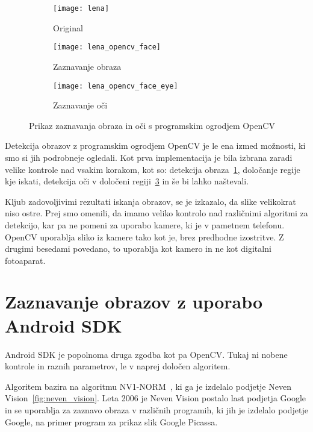 \begin{figure}[!ht]
    \centering
    \begin{subfigure}[b]{0.3\textwidth}
        \texttt{[image: lena]}
        \caption{Original}
    \end{subfigure}
    \begin{subfigure}[b]{0.3\textwidth}
        \texttt{[image: lena\_opencv\_face]}
        \caption{Zaznavanje obraza}
        \label{fig:lena_opencv_face}
    \end{subfigure}
    \begin{subfigure}[b]{0.3\textwidth}
        \texttt{[image: lena\_opencv\_face\_eye]}
        \caption{Zaznavanje oči}
        \label{fig:lena_opencv_face_eye}
    \end{subfigure}
    \caption{Prikaz zaznavanja obraza in oči s programskim ogrodjem OpenCV}
\end{figure}

Detekcija obrazov z programskim ogrodjem OpenCV je le ena izmed možnosti, ki
smo si jih podrobneje ogledali. Kot prva implementacija je bila izbrana zaradi
velike kontrole nad vsakim korakom, kot so: detekcija
obraza~\ref{fig:lena_opencv_face}, določanje regije kje iskati, detekcija oči
v določeni regiji~\ref{fig:lena_opencv_face_eye} in še bi lahko naštevali.

Kljub zadovoljivimi rezultati iskanja obrazov, se je izkazalo, da slike
velikokrat niso ostre. Prej smo omenili, da imamo veliko kontrolo nad
različnimi algoritmi za detekcijo, kar pa ne pomeni za uporabo kamere, ki je v
pametnem telefonu. OpenCV uporablja sliko iz kamere tako kot je, brez
predhodne izostritve. Z drugimi besedami povedano, to uporablja kot kamero in
ne kot digitalni fotoaparat.


\section{Zaznavanje obrazov z uporabo Android SDK}
Android SDK je popolnoma druga zgodba kot pa OpenCV. Tukaj ni nobene kontrole in raznih parametrov, le v naprej določen algoritem.

Algoritem bazira na algoritmu NV1-NORM~\cite{nevenFaceRecognition}, ki ga je
izdelalo podjetje Neven Vision~\ref{fig:neven_vision}. Leta 2006 je Neven
Vision postalo last podjetja Google in se uporablja za zaznavo obraza v
različnih programih, ki jih je izdelalo podjetje Google, na primer program za
prikaz slik Google Picassa.

